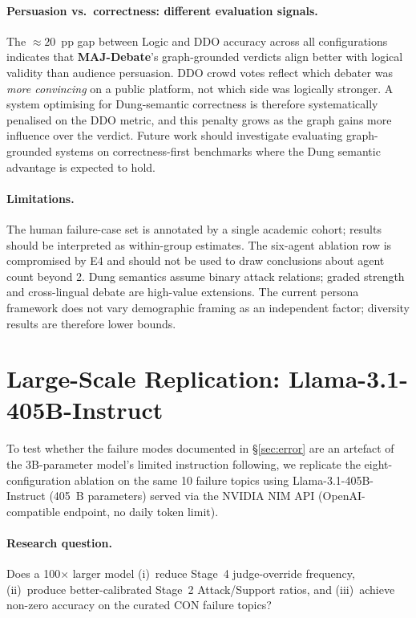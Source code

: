 \documentclass[11pt,twocolumn,letterpaper]{article}
\newcommand{\sys}{\textbf{MAJ-Debate}}
\newcommand{\LargeModel}{Llama-3.1-405B-Instruct}
\begin{document}
\paragraph{Persuasion vs.\ correctness: different evaluation signals.}
The ${\approx}20$~pp gap between Logic and DDO accuracy across all
configurations indicates that \sys{}'s graph-grounded verdicts align
better with logical validity than audience persuasion.
DDO crowd votes reflect which debater was \emph{more convincing} on a
public platform, not which side was logically stronger.
A system optimising for Dung-semantic correctness is therefore
systematically penalised on the DDO metric, and this penalty grows as the
graph gains more influence over the verdict.
Future work should investigate evaluating graph-grounded systems on
correctness-first benchmarks where the Dung semantic advantage is
expected to hold.

\paragraph{Limitations.}
The human failure-case set is annotated by a single academic cohort;
results should be interpreted as within-group estimates.
The six-agent ablation row is compromised by E4 and should not be used
to draw conclusions about agent count beyond 2.
Dung semantics assume binary attack relations; graded strength and
cross-lingual debate are high-value extensions.
The current persona framework does not vary demographic framing as an
independent factor; diversity results are therefore lower bounds.

\section{Large-Scale Replication: \LargeModel{}}
\label{sec:llama405}

To test whether the failure modes documented in \S\ref{sec:error} are an
artefact of the 3B-parameter model's limited instruction following, we
replicate the eight-configuration ablation on the same 10 failure topics
using \LargeModel{} (405~B parameters) served via the NVIDIA NIM API
(OpenAI-compatible endpoint, no daily token limit).

\paragraph{Research question.}
Does a 100$\times$ larger model (i)~reduce Stage~4 judge-override frequency,
(ii)~produce better-calibrated Stage~2 Attack/Support ratios, and
(iii)~achieve non-zero accuracy on the curated CON failure topics?
\end{document}
